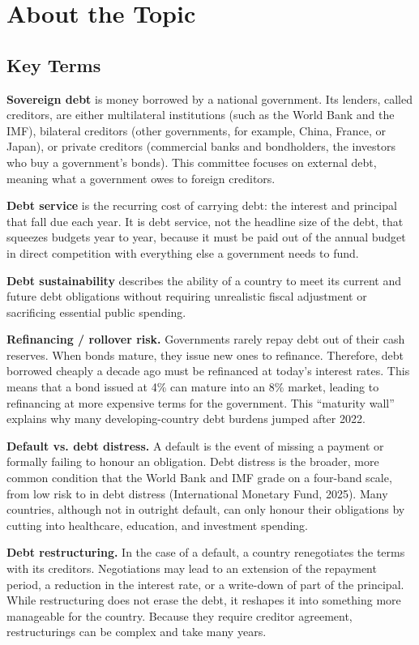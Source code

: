 \section{About the Topic}

\subsection{Key Terms}

\textbf{Sovereign debt} is money borrowed by a national government. Its lenders, called creditors, are either multilateral institutions (such as the World Bank and the IMF), bilateral creditors (other governments, for example, China, France, or Japan), or private creditors (commercial banks and bondholders, the investors who buy a government’s bonds). This committee focuses on external debt, meaning what a government owes to foreign creditors.

\textbf{Debt service} is the recurring cost of carrying debt: the interest and principal that fall due each year. It is debt service, not the headline size of the debt, that squeezes budgets year to year, because it must be paid out of the annual budget in direct competition with everything else a government needs to fund.

\textbf{Debt sustainability} describes the ability of a country to meet its current and future debt obligations without requiring unrealistic fiscal adjustment or sacrificing essential public spending.

\textbf{Refinancing / rollover risk.} Governments rarely repay debt out of their cash reserves. When bonds mature, they issue new ones to refinance. Therefore, debt borrowed cheaply a decade ago must be refinanced at today’s interest rates. This means that a bond issued at 4\% can mature into an 8\% market, leading to refinancing at more expensive terms for the government. This “maturity wall” explains why many developing-country debt burdens jumped after 2022.

\textbf{Default vs. debt distress.} A default is the event of missing a payment or formally failing to honour an obligation. Debt distress is the broader, more common condition that the World Bank and IMF grade on a four-band scale, from low risk to in debt distress (International Monetary Fund, 2025). Many countries, although not in outright default, can only honour their obligations by cutting into healthcare, education, and investment spending.

\textbf{Debt restructuring.} In the case of a default, a country renegotiates the terms with its creditors. Negotiations may lead to an extension of the repayment period, a reduction in the interest rate, or a write-down of part of the principal. While restructuring does not erase the debt, it reshapes it into something more manageable for the country. Because they require creditor agreement, restructurings can be complex and take many years.

